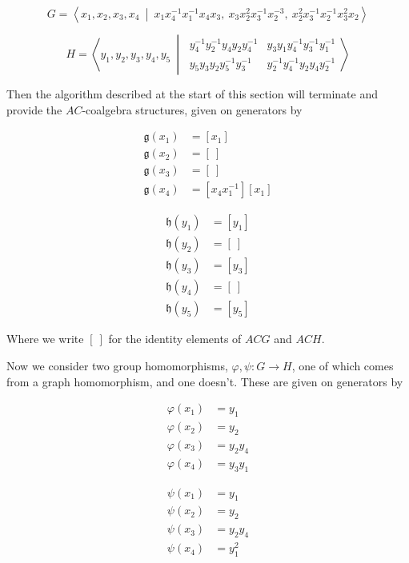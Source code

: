 \documentclass[12pt]{article}
\theoremstyle{definition}
\theoremstyle{theorem}
\begin{document}
\[
  G =
  \left \langle 
  x_1, x_2, x_3, x_4
  \ \middle | \ 
  x_1 x_4^{-1} x_1^{-1} x_4 x_3, \ 
  x_3 x_2^2 x_3^{-1} x_2^{-3}, \ 
  x_2^2 x_3^{-1} x_2^{-1} x_3^2 x_2
  \right \rangle
\]

\[
  H = 
  \left \langle 
  y_1,y_2,y_3,y_4,y_5
  \ \middle | \ 
  \begin{array}{cc}
    y_4^{-1} y_2^{-1} y_4 y_2 y_4^{-1} & y_3 y_1 y_4^{-1} y_3^{-1} y_1^{-1} \\
    y_5 y_3 y_2 y_5^{-1} y_3^{-1} & y_2^{-1} y_4^{-1} y_2 y_4 y_2^{-1}
  \end{array}
  \right \rangle
\]

Then the algorithm described at the start of this section will terminate and 
provide the $AC$-coalgebra structures, given on generators by

\noindent\begin{minipage}{.5\linewidth}
\begin{align*}
  \mathfrak{g}(x_1) &= [x_1] \\
  \mathfrak{g}(x_2) &= [\ ]  \\
  \mathfrak{g}(x_3) &= [\ ]  \\
  \mathfrak{g}(x_4) &= [x_4 x_1^{-1}][x_1]
\end{align*}
\end{minipage}%
\begin{minipage}{.5\linewidth}  
\begin{align*}
  \mathfrak{h}(y_1) &= [y_1] \\
  \mathfrak{h}(y_2) &= [\ ]  \\
  \mathfrak{h}(y_3) &= [y_3] \\
  \mathfrak{h}(y_4) &= [\ ]  \\
  \mathfrak{h}(y_5) &= [y_5]
\end{align*}
\end{minipage}

Where we write $[ \ ]$ for the identity elements of $ACG$ and $ACH$.

Now we consider two group homomorphisms, $\varphi, \psi : G \to H$, 
one of which comes from a graph homomorphism, and one doesn't. 
These are given on generators by

\noindent\begin{minipage}{.5\linewidth}
\begin{align*}
  \varphi(x_1) &= y_1 \\
  \varphi(x_2) &= y_2 \\
  \varphi(x_3) &= y_2 y_4 \\
  \varphi(x_4) &= y_3 y_1
\end{align*}
\end{minipage}%
\begin{minipage}{.5\linewidth}
\begin{align*}
  \psi(x_1) &= y_1 \\
  \psi(x_2) &= y_2 \\
  \psi(x_3) &= y_2 y_4 \\
  \psi(x_4) &= y_1^2
\end{align*}
\end{minipage}
\end{document}
